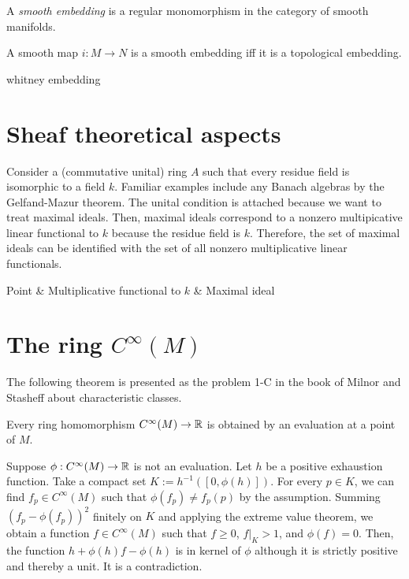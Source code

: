 \documentclass{../note}
\begin{document}
\begin{defn}
A \emph{smooth embedding} is a regular monomorphism in the category of smooth manifolds.
\end{defn}
\begin{prop}
A smooth map $i:M\to N$ is a smooth embedding iff it is a topological embedding.
\end{prop}

whitney embedding















\section{Sheaf theoretical aspects}
Consider a (commutative unital) ring $A$ such that every residue field is isomorphic to a field $k$.
Familiar examples include any Banach algebras by the Gelfand-Mazur theorem.
The unital condition is attached because we want to treat maximal ideals.
Then, maximal ideals correspond to a nonzero multipicative linear functional to $k$ because the residue field is $k$.
Therefore, the set of maximal ideals can be identified with the set of all nonzero multiplicative linear functionals.


\begin{rd}
Point  & Multiplicative functional to $k$  & Maximal ideal 
\end{rd}

\section{The ring $C^\infty(M)$}
The following theorem is presented as the problem 1-C in the book of Milnor and Stasheff about characteristic classes.
\begin{thm}
Every ring homomorphism $C^\infty(M)\to\mathbb{R}$ is obtained by an evaluation at a point of $M$.
\end{thm}
\begin{pf}
Suppose $\phi:C^\infty(M)\to\mathbb{R}$ is not an evaluation.
Let $h$ be a positive exhaustion function.
Take a compact set $K:=h^{-1}([0,\phi(h)])$.
For every $p\in K$, we can find $f_p\in C^\infty(M)$ such that $\phi(f_p)\ne f_p(p)$ by the assumption.
Summing $(f_p-\phi(f_p))^2$ finitely on $K$ and applying the extreme value theorem, we obtain a function $f\in C^\infty(M)$ such that $f\ge0$, $f|_K>1$, and $\phi(f)=0$.
Then, the function $h+\phi(h)f-\phi(h)$ is in kernel of $\phi$ although it is strictly positive and thereby a unit.
It is a contradiction.
\end{pf}
\end{document}
